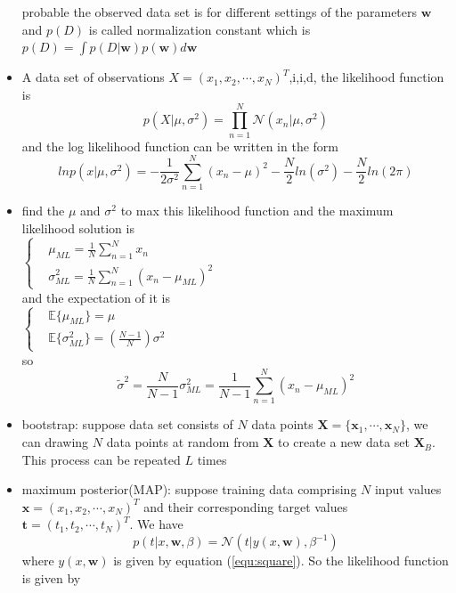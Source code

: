 \documentclass[UTF8]{article}
\begin{document}
\begin{itemize}
        probable the observed data set is for different settings of the parameters $\bm{w}$
        and $p(D)$ is called normalization constant which is 
        $p(D)=\int p(D|\bm{w})p(\bm{w})d\bm{w}$
        \item A data set of observations $X=(x_1,x_2,\cdots,x_N)^T$,i,i,d, the likelihood
        function is
        \[
            p(X|\mu,\sigma^2)=\prod_{n=1}^N\mathcal{N}(x_n|\mu,\sigma^2)
            \]
        and the log likelihood function can be written in the form
        \[
            lnp(x|\mu,\sigma^2)=-\frac{1}{2\sigma^2}\sum_{n=1}^N(x_n-\mu)^2-\frac{N}{2}
            ln(\sigma^2)-\frac{N}{2}ln(2\pi)
            \]
        \item find the $\mu$ and $\sigma^2$ to max this likelihood function and the maximum
        likelihood solution is\\
        $ \begin{cases}
        &\mu_{ML}=\frac{1}{N}\sum_{n=1}^Nx_n\\
        &\sigma_{ML}^2=\frac{1}{N}\sum_{n=1}^{N}(x_n-\mu_{ML})^2
        \end{cases}$\\
        and the expectation of it is\\
        $\begin{cases}
        &\mathbb{E}\lbrace \mu_{ML}\rbrace=\mu\\
        &\mathbb{E}\lbrace \sigma_{ML}^2\rbrace=(\frac{N-1}{N})\sigma^2
        \end{cases}$\\
        so
        \[\widetilde{\sigma}^2=\frac{N}{N-1}\sigma_{ML}^2=\frac{1}{N-1}
        \sum_{n=1}^N(x_n-\mu_{ML})^2\]
        \item bootstrap: suppose data set consists of $N$ data points $\bm{X}=\{\bm{x}_1,
        \cdots,\bm{x}_N\}$, we can drawing $N$ data points at random from $\bm{X}$ to create 
        a new data set $\bm{X}_B$. This process can be repeated $L$ times
        \item maximum posterior(MAP): suppose training data comprising $N$ input values 
        $\bm{x}=(x_1,x_2,\cdots,x_N)^T$ and their corresponding target values $\bm{t}=(t_1,
        t_2,\cdots,t_N)^T$. We have
        \begin{equation}
            p(t|x,\bm{w},\beta)=\mathcal{N}(t|y(x,\bm{w}),\beta^{-1})
        \end{equation}
        where $y(x,\bm{w})$ is given by equation (\ref{equ:square}). So the likelihood function is
        given by
        \[
\]
\end{itemize}
\end{document}

